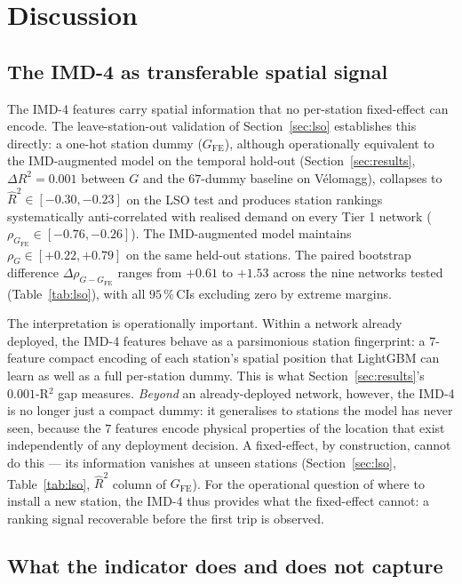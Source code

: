 \documentclass[11pt,a4paper]{article}
\begin{document}
\section{Discussion}
\label{sec:discussion}

\subsection{The IMD-4 as transferable spatial signal}

The IMD-4 features carry spatial information that no per-station
fixed-effect can encode.  The leave-station-out validation of
Section~\ref{sec:lso} establishes this directly: a one-hot
station dummy ($G_{\mathrm{FE}}$), although operationally
equivalent to the IMD-augmented model on the temporal hold-out
(Section~\ref{sec:results}, $\Delta R^2 = 0.001$ between $G$ and
the $67$-dummy baseline on V\'elomagg), collapses to
$\hat{R}^2 \in [-0.30, -0.23]$ on the LSO test and produces
station rankings systematically anti-correlated with realised
demand on every Tier 1 network
($\rho_{G_{\mathrm{FE}}} \in [-0.76, -0.26]$).  The IMD-augmented
model maintains $\rho_G \in [+0.22, +0.79]$ on the same held-out
stations.  The paired bootstrap difference
$\Delta\rho_{G - G_{\mathrm{FE}}}$ ranges from $+0.61$ to $+1.53$
across the nine networks tested (Table~\ref{tab:lso}), with all
$95\,\%$\,CIs excluding zero by extreme margins.

The interpretation is operationally important.  Within a network
already deployed, the IMD-4 features behave as a parsimonious
station fingerprint: a $7$-feature compact encoding of each
station's spatial position that LightGBM can learn as well as a
full per-station dummy.  This is what Section~\ref{sec:results}'s
$0.001$-R$^2$ gap measures.  \emph{Beyond} an already-deployed
network, however, the IMD-4 is no longer just a compact dummy:
it generalises to stations the model has never seen, because the
$7$ features encode physical properties of the location that
exist independently of any deployment decision.  A fixed-effect,
by construction, cannot do this — its information vanishes at
unseen stations (Section~\ref{sec:lso}, Table~\ref{tab:lso},
$\hat{R}^2$ column of $G_{\mathrm{FE}}$).  For the operational
question of where to install a new station, the IMD-4 thus
provides what the fixed-effect cannot: a ranking signal
recoverable before the first trip is observed.

\subsection{What the indicator does and does not capture}
\end{document}
